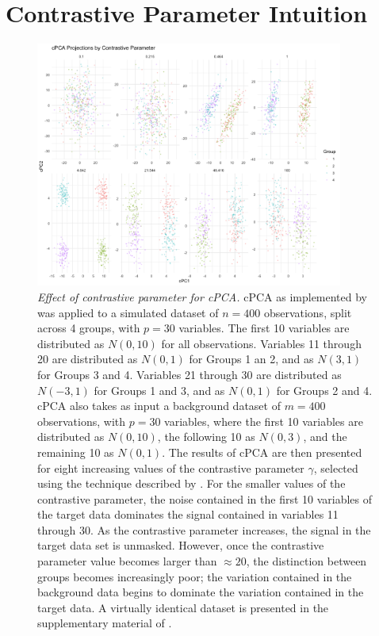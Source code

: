 \FloatBarrier

\section{Contrastive Parameter Intuition}

\begin{figure}[!htbp]
    \centering
    \includegraphics[width=0.9\textwidth]{figures/cpca_example_plot.png}
    \caption{
    {\em Effect of contrastive parameter for cPCA.}
    cPCA as implemented by \citet{Abid2018} was applied to a simulated dataset of $n=400$ observations, split across 4 groups, with $p=30$ variables. The first 10 variables are distributed as $N(0, 10)$ for all observations. Variables 11
    through 20 are distributed as $N(0, 1)$ for Groups 1 an 2, and as $N(3, 1)$
    for Groups 3 and 4. Variables 21 through 30 are distributed as $N(-3, 1)$
    for Groups 1 and 3, and as $N(0, 1)$ for Groups 2 and 4. cPCA also takes
    as input a background dataset of $m=400$ observations, with $p=30$
    variables, where the first 10 variables are distributed as $N(0, 10)$, the
    following 10 as $N(0, 3)$, and the remaining 10 as $N(0, 1)$. The results
    of cPCA are then presented for eight increasing values of the contrastive
    parameter $\gamma$, selected using the technique described by \citet{Abid2018}. For the smaller values of the contrastive parameter, the
    noise contained in the first 10 variables of the target data dominates the
    signal contained in variables 11 through 30. As the contrastive parameter
    increases, the signal in the target data set is unmasked. However, once the
    contrastive parameter value becomes larger than $\approx 20$, the
    distinction between groups becomes increasingly poor; the variation
    contained in the background data begins to dominate the variation contained
    in the target data. A virtually identical dataset is presented in the
    supplementary material of \citet{Abid2018}. }
    \label{fig:contrastive_par}
\end{figure}

